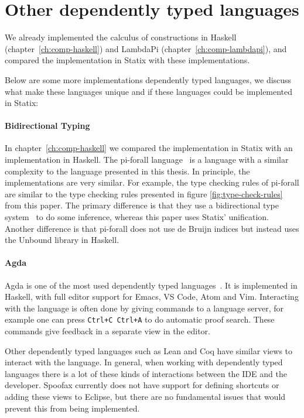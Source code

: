 \section{Other dependently typed languages}

We already implemented the calculus of constructions in Haskell (chapter~\ref{ch:comp-haskell}) and LambdaPi (chapter~\ref{ch:comp-lambdapi}), and compared the implementation in Statix with these implementations. 

Below are some more implementations dependently typed languages, we discuss what make these languages unique and if these languages could be implemented in Statix: 

\paragraph{Bidirectional Typing}

In chapter~\ref{ch:comp-haskell} we compared the implementation in Statix with an implementation in Haskell. The pi-forall language~\cite{pi_forall} is a language with a similar complexity to the language presented in this thesis. In principle, the implementations are very similar. For example, the type checking rules of pi-forall are similar to the type checking rules presented in figure \ref{fig:type-check-rules} from this paper. The primary difference is that they use a bidirectional type system~\cite{bidirectional} to do some inference, whereas this paper uses Statix' unification. Another difference is that pi-forall does not use de Bruijn indices but instead uses the Unbound library in Haskell.

\paragraph{Agda}

Agda is one of the most used dependently typed languages~\cite{agda}. It is implemented in Haskell, with full editor support for Emacs, VS Code, Atom and Vim. Interacting with the language is often done by giving commands to a language server, for example one can press \verb|Ctrl+C Ctrl+A| to do automatic proof search. These commands give feedback in a separate view in the editor. 

Other dependently typed languages such as Lean and Coq have similar views to interact with the language. In general, when working with dependently typed languages there is a lot of these kinds of interactions between the IDE and the developer. Spoofax currently does not have support for defining shortcuts or adding these views to Eclipse, but there are no fundamental issues that would prevent this from being implemented.  


